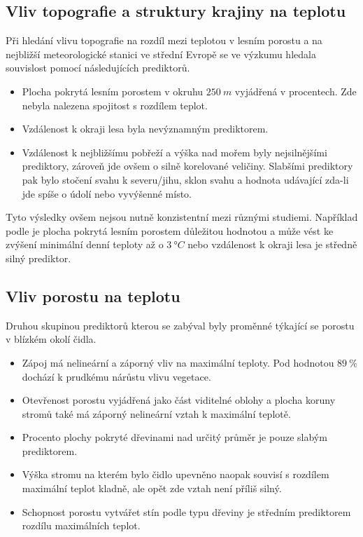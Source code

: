 \subsection{Vliv topografie a struktury krajiny na teplotu}
Při hledání vlivu topografie na rozdíl mezi teplotou v lesním porostu a na nejbližší meteorologické stanici ve střední Evropě se ve výzkumu \cite{ZellwegerFlorian2019Sdou} hledala souvislost pomocí následujících prediktorů.

\begin{itemize}
	\item Plocha pokrytá lesním porostem v okruhu $\SI{250}{m}$ vyjádřená v procentech. Zde nebyla nalezena spojitost s rozdílem teplot.
	\item Vzdálenost k okraji lesa byla nevýznamným prediktorem. 
	\item Vzdálenost k nejbližšímu pobřeží a výška nad mořem byly nejsilnějšími prediktory, zároveň jde ovšem o silně korelované veličiny. Slabšími prediktory pak bylo stočení svahu k severu/jihu, sklon svahu a hodnota udávající zda-li jde spíše o údolí nebo vyvýšenné místo.
\end{itemize}

Tyto výsledky ovšem nejsou nutně konzistentní mezi různými studiemi. Například podle \cite{GreiserCaroline2018Mmmi} je plocha pokrytá lesním porostem důležitou hodnotou a může vést ke zvýšení minimální denní teploty až o $\SI{3}{\degree C}$ nebo vzdálenost k okraji lesa je středně silný prediktor.

\subsection{Vliv porostu na teplotu}
Druhou skupinou prediktorů kterou se \cite{ZellwegerFlorian2019Sdou} zabýval byly proměnné týkající se porostu v blízkém okolí čidla.

\begin{itemize}
	\item Zápoj má nelineární a záporný vliv na maximální teploty. Pod hodnotou $\SI{89}{\%}$ dochází k prudkému nárůstu vlivu vegetace.
	\item Otevřenost porostu vyjádřená jako část viditelné oblohy a plocha koruny stromů také má záporný nelineární vztah k maximální teplotě.
	\item Procento plochy pokryté dřevinami nad určitý průměr je pouze slabým prediktorem. 
	\item Výška stromu na kterém bylo čidlo upevněno naopak souvisí s rozdílem maximální teplot kladně, ale opět zde vztah není příliš silný.
	\item Schopnost porostu vytvářet stín podle typu dřeviny je středním prediktorem rozdílu maximálních teplot.
\end{itemize}

